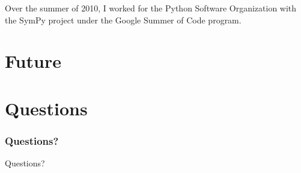 \documentclass{beamer}
\numberwithin{equation}{section} %
\begin{document}
\begin{frame}
    \begin{figure}
   \end{figure}

    Over the summer of 2010, I worked for the Python Software
    Organization with the SymPy project under the Google Summer of Code
    program.
\end{frame}

\section{Future}

\begin{frame}

\end{frame}


\section{Questions}

\begin{frame}
    \frametitle{Questions?}
    \huge{Questions?}
\end{frame}
\end{document}
